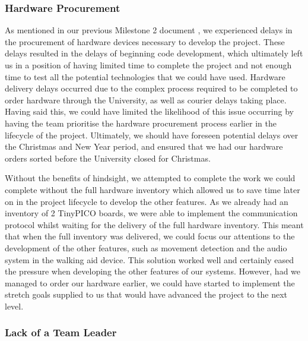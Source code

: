             \subsubsection{Hardware Procurement}
            \label{subsec:hardware_procurement}

                As mentioned in our previous Milestone 2 document \cite{mile2}, we experienced delays in the procurement of hardware devices necessary to develop the project. These delays resulted in the delays of beginning code development, which ultimately left us in a position of having limited time to complete the project and not enough time to test all the potential technologies that we could have used. Hardware delivery delays occurred due to the complex process required to be completed to order hardware through the University, as well as courier delays taking place. Having said this, we could have limited the likelihood of this issue occurring by having the team prioritise the hardware procurement process earlier in the lifecycle of the project. Ultimately, we should have foreseen potential delays over the Christmas and New Year period, and ensured that we had our hardware orders sorted before the University closed for Christmas. 

                Without the benefits of hindsight, we attempted to complete the work we could complete without the full hardware inventory which allowed us to save time later on in the project lifecycle to develop the other features. As we already had an inventory of 2 TinyPICO boards, we were able to implement the communication protocol whilst waiting for the delivery of the full hardware inventory. This meant that when the full inventory was delivered, we could focus our attentions to the development of the other features, such as movement detection and the audio system in the walking aid device. This solution worked well and certainly eased the pressure when developing the other features of our systems. However, had we managed to order our hardware earlier, we could have started to implement the stretch goals supplied to us that would have advanced the project to the next level.

            \subsubsection{Lack of a Team Leader}

